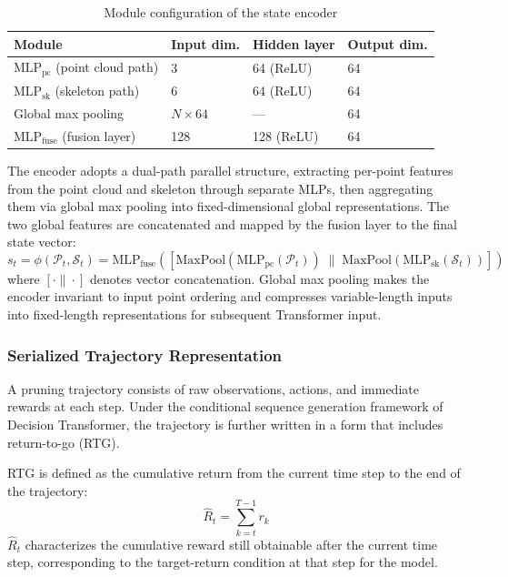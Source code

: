 \documentclass[12pt,a4paper,fontset=fandol]{ctexart}
\begin{document}
\begin{table}[H]
\centering
\small
\begin{tabular}{llll}
\toprule
\textbf{Module} & \textbf{Input dim.} & \textbf{Hidden layer} & \textbf{Output dim.} \\
\midrule
$\text{MLP}_{\text{pc}}$ (point cloud path) & 3 & 64 (ReLU) & 64 \\
$\text{MLP}_{\text{sk}}$ (skeleton path) & 6 & 64 (ReLU) & 64 \\
Global max pooling & $N \times 64$ & --- & 64 \\
$\text{MLP}_{\text{fuse}}$ (fusion layer) & 128 & 128 (ReLU) & 64 \\
\bottomrule
\end{tabular}
\caption{Module configuration of the state encoder}
\label{tab:encoder_config}
\end{table}

The encoder adopts a dual-path parallel structure,
extracting per-point features from the point cloud and skeleton through separate MLPs,
then aggregating them via global max pooling into fixed-dimensional global representations.
The two global features are concatenated and mapped by the fusion layer to the final state vector:
\begin{equation}\label{eq:state_encode}
  s_t = \phi(\mathcal{P}_t, \mathcal{S}_t) =
    \text{MLP}_{\text{fuse}}\!\left(
      \left[\text{MaxPool}\!\left(\text{MLP}_{\text{pc}}(\mathcal{P}_t)\right) \;\big\|\;
       \text{MaxPool}\!\left(\text{MLP}_{\text{sk}}(\mathcal{S}_t)\right)\right]
    \right)
\end{equation}
where $[\cdot \| \cdot]$ denotes vector concatenation.
Global max pooling makes the encoder invariant to input point ordering
and compresses variable-length inputs into fixed-length representations for subsequent Transformer input.

\subsubsection{Serialized Trajectory Representation}

A pruning trajectory consists of raw observations, actions, and immediate rewards at each step.
Under the conditional sequence generation framework of Decision Transformer,
the trajectory is further written in a form that includes return-to-go (RTG).

RTG is defined as the cumulative return from the current time step to the end of the trajectory:
\begin{equation}\label{eq:rtg}
  \hat{R}_t = \sum_{k=t}^{T-1} r_k
\end{equation}
$\hat{R}_t$ characterizes the cumulative reward still obtainable after the current time step,
corresponding to the target-return condition at that step for the model.
\end{document}
